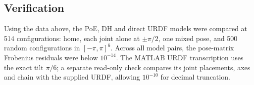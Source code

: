 \subsection{Verification}
\label{sec:fk-verification}

Using the data above, the PoE, DH and direct URDF models were compared at
514 configurations: home, each joint alone at $\pm\pi/2$, one mixed pose,
and 500 random configurations in $[-\pi,\pi]^6$.
Across all model pairs, the pose-matrix Frobenius residuals were below
$10^{-14}$. The MATLAB URDF transcription uses the exact tilt $\pi/6$;
a separate read-only check compares its joint placements, axes and chain
with the supplied URDF, allowing $10^{-10}$ for decimal truncation.
